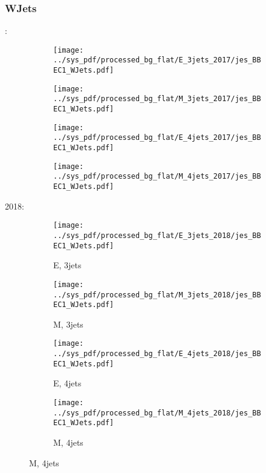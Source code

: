 \documentclass{beamer}
\begin{document}
\begin{frame}
\frametitle{WJets}
\fontsize{5}{1}:
\begin{figure}
\centering
\begin{subfigure}[b]{0.24\textwidth}
\texttt{[image: ../sys\_pdf/processed\_bg\_flat/E\_3jets\_2017/jes\_BBEC1\_WJets.pdf]}
\end{subfigure}
\begin{subfigure}[b]{0.24\textwidth}
\texttt{[image: ../sys\_pdf/processed\_bg\_flat/M\_3jets\_2017/jes\_BBEC1\_WJets.pdf]}
\end{subfigure}
\begin{subfigure}[b]{0.24\textwidth}
\texttt{[image: ../sys\_pdf/processed\_bg\_flat/E\_4jets\_2017/jes\_BBEC1\_WJets.pdf]}
\end{subfigure}
\begin{subfigure}[b]{0.24\textwidth}
\texttt{[image: ../sys\_pdf/processed\_bg\_flat/M\_4jets\_2017/jes\_BBEC1\_WJets.pdf]}
\end{subfigure}
\end{figure}
2018:
\begin{figure}
\centering
\begin{subfigure}[b]{0.24\textwidth}
\texttt{[image: ../sys\_pdf/processed\_bg\_flat/E\_3jets\_2018/jes\_BBEC1\_WJets.pdf]}
\captionsetup{font=tiny}
\caption{E, 3jets}
\end{subfigure}
\begin{subfigure}[b]{0.24\textwidth}
\texttt{[image: ../sys\_pdf/processed\_bg\_flat/M\_3jets\_2018/jes\_BBEC1\_WJets.pdf]}
\captionsetup{font=tiny}
\caption{M, 3jets}
\end{subfigure}
\begin{subfigure}[b]{0.24\textwidth}
\texttt{[image: ../sys\_pdf/processed\_bg\_flat/E\_4jets\_2018/jes\_BBEC1\_WJets.pdf]}
\captionsetup{font=tiny}
\caption{E, 4jets}
\end{subfigure}
\begin{subfigure}[b]{0.24\textwidth}
\texttt{[image: ../sys\_pdf/processed\_bg\_flat/M\_4jets\_2018/jes\_BBEC1\_WJets.pdf]}
\captionsetup{font=tiny}
\caption{M, 4jets}
\end{subfigure}
\end{figure}
\end{frame}
\end{document}
